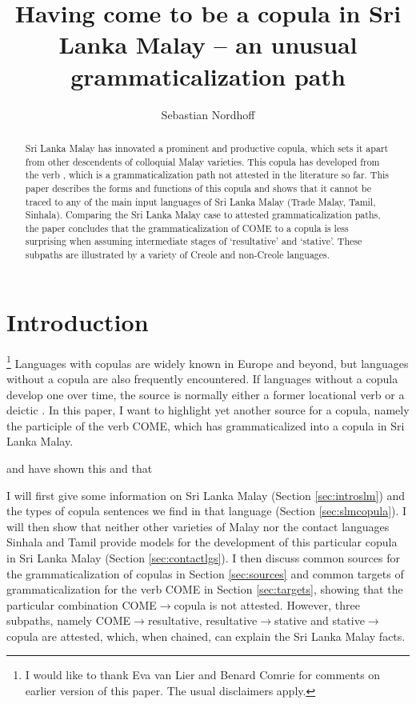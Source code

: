 \documentclass[a4paper,12pt]{article}
\title{Having come to be a copula in Sri Lanka Malay -- an unusual grammaticalization path}
\author{Sebastian Nordhoff}
\begin{document}
\maketitle

\begin{abstract}
Sri Lanka Malay has innovated a prominent and productive copula, which sets it apart from other descendents of colloquial Malay varieties. This copula has developed from the verb , which is a grammaticalization path not attested in the literature so far. This paper describes the forms and functions of this copula and shows that it cannot be traced to any of the main input languages of Sri Lanka Malay (Trade Malay, Tamil, Sinhala). Comparing the Sri Lanka Malay case to attested grammaticalization paths, the paper concludes that the grammaticalization of COME to a copula is less surprising when assuming intermediate stages of `resultative' and `stative'. These subpaths are illustrated by a variety of Creole and non-Creole languages.
\end{abstract}

\section{Introduction}
\thanks{I would like to thank Eva van Lier and Benard Comrie for comments on earlier version of this paper. The usual disclaimers apply.}
Languages with copulas are widely known in Europe and beyond, but languages without a copula are also frequently encountered. If languages without a copula develop one over time, the source is normally either a former locational verb or a deictic \citep[91]{Stassen1997}. In this paper, I want to highlight yet another source for a copula, namely the participle of the verb COME, which has grammaticalized into a copula in Sri Lanka Malay.
 
\citet{Slomanson2006cll} and \citet{Ansaldo2005ms} have shown this and that

I will first give some information on Sri Lanka Malay (Section \ref{sec:introslm})
and the types of copula sentences we find in that language (Section \ref{sec:slmcopula}).
I will then show that neither other varieties of Malay nor the contact languages Sinhala and Tamil provide models for the development of this particular copula in Sri Lanka Malay (Section \ref{sec:contactlgs}). I then discuss common sources for the grammaticalization of copulas in Section \ref{sec:sources} and common targets of grammaticalization for the verb COME in Section \ref{sec:targets}, showing that the particular combination COME$\to$copula is not attested. However, three subpaths, namely  COME$\to$resultative, resultative$\to$stative and stative$\to$copula are attested, which, when chained, can explain the Sri Lanka Malay facts.
\end{document}
